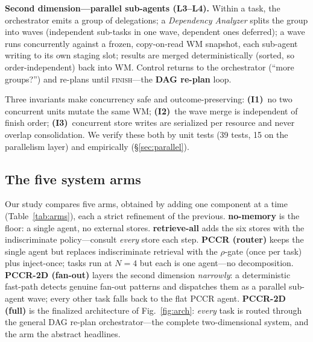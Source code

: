 \documentclass[10pt,twocolumn]{article}
\begin{document}
\textbf{Second dimension---parallel sub-agents (L3--L4).} Within a task, the orchestrator emits a group
of delegations; a \emph{Dependency Analyzer} splits the group into waves (independent sub-tasks in one
wave, dependent ones deferred); a wave runs concurrently against a frozen, copy-on-read WM snapshot,
each sub-agent writing to its own staging slot; results are merged deterministically (sorted, so
order-independent) back into WM. Control returns to the orchestrator (``more groups?'') and re-plans
until \textsc{finish}---the \textbf{DAG re-plan} loop.

Three invariants make concurrency safe and outcome-preserving: \textbf{(I1)}~no two concurrent units
mutate the same WM; \textbf{(I2)}~the wave merge is independent of finish order; \textbf{(I3)}~concurrent
store writes are serialized per resource and never overlap consolidation. We verify these both by unit
tests (39 tests, 15 on the parallelism layer) and empirically (\S\ref{sec:parallel}).

\subsection{The five system arms}\label{sec:arms}
Our study compares five arms, obtained by adding one component at a time (Table~\ref{tab:arms}), each a
strict refinement of the previous. \textbf{no-memory} is the floor: a single agent, no external stores.
\textbf{retrieve-all} adds the six stores with the indiscriminate policy---consult \emph{every} store
each step. \textbf{PCCR (router)} keeps the single agent but replaces indiscriminate retrieval with the
$\rho$-gate (once per task) plus inject-once; tasks run at $N{=}4$ but each is one agent---no
decomposition. \textbf{PCCR-2D (fan-out)} layers the second dimension \emph{narrowly}: a deterministic
fast-path detects genuine fan-out patterns and dispatches them as a parallel sub-agent wave; every
other task falls back to the flat PCCR agent. \textbf{PCCR-2D (full)} is the finalized architecture of
Fig.~\ref{fig:arch}: \emph{every} task is routed through the general DAG re-plan orchestrator---the
complete two-dimensional system, and the arm the abstract headlines.
\end{document}
